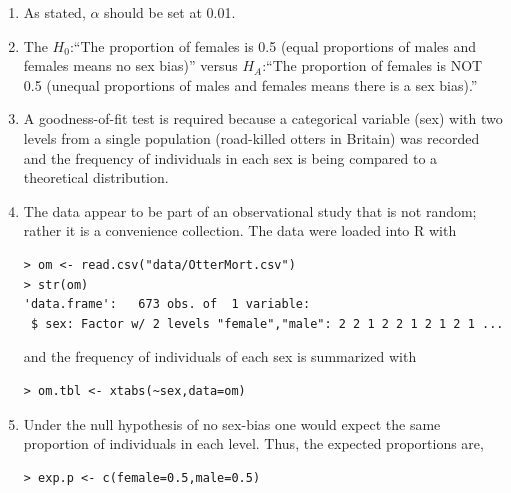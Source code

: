 \documentclass[10pt,openany]{book}\usepackage[]{graphicx}\usepackage[]{color}
\makeatletter
\newenvironment{kframe}{%
 \def\at@end@of@kframe{}%
 \ifinner\ifhmode%
  \def\at@end@of@kframe{\end{minipage}}%
  \begin{minipage}{\columnwidth}%
 \fi\fi%
 \def\FrameCommand##1{\hskip\@totalleftmargin \hskip-\fboxsep
 \colorbox{shadecolor}{##1}\hskip-\fboxsep
     \hskip-\linewidth \hskip-\@totalleftmargin \hskip\columnwidth}%
 \MakeFramed {\advance\hsize-\width
   \@totalleftmargin\z@ \linewidth\hsize
   \@setminipage}}%
 {\par\unskip\endMakeFramed%
 \at@end@of@kframe}
\newenvironment{knitrout}{}{} %
\makeatother
\begin{document}
\begin{itemize}
    \begin{enumerate}
      \item As stated, $\alpha$ should be set at 0.01.
      \item The $H_{0}$:``The proportion of females is 0.5 (equal proportions of males and females means no sex bias)'' versus $H_{A}$:``The proportion of females is NOT 0.5 (unequal proportions of males and females means there is a sex bias).''
      \item A goodness-of-fit test is required because a categorical variable (sex) with two levels from a single population (road-killed otters in Britain) was recorded and the frequency of individuals in each sex is being compared to a theoretical distribution.
      \item The data appear to be part of an observational study that is not random; rather it is a convenience collection.  The data were loaded into R with
\begin{knitrout}
\color{fgcolor}\begin{kframe}
\begin{verbatim}
> om <- read.csv("data/OtterMort.csv")
> str(om)
'data.frame':	673 obs. of  1 variable:
 $ sex: Factor w/ 2 levels "female","male": 2 2 1 2 2 1 2 1 2 1 ...
\end{verbatim}
\end{kframe}
\end{knitrout}
and the frequency of individuals of each sex is summarized with
\begin{knitrout}
\color{fgcolor}\begin{kframe}
\begin{verbatim}
> om.tbl <- xtabs(~sex,data=om)
\end{verbatim}
\end{kframe}
\end{knitrout}
      \item Under the null hypothesis of no sex-bias one would expect the same proportion of individuals in each level.  Thus, the expected proportions are,
\begin{knitrout}
\color{fgcolor}\begin{kframe}
\begin{verbatim}
> exp.p <- c(female=0.5,male=0.5)
\end{verbatim}
\end{kframe}
\end{knitrout}

\end{enumerate}
\end{itemize}
\end{document}
